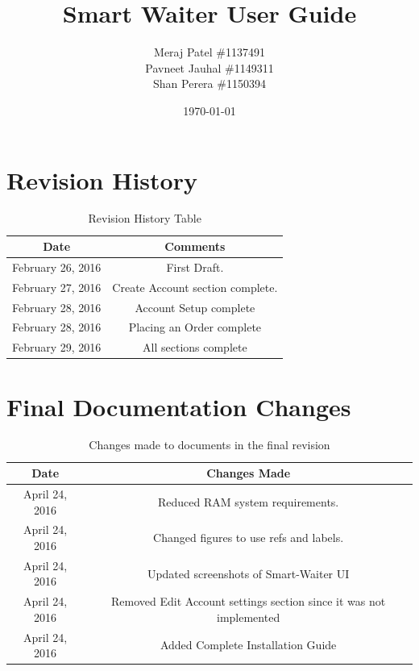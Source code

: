 \documentclass[12pt, titlepage]{article}
\begin{document}
\title{Smart Waiter User Guide} 
\author{Meraj Patel \#1137491 \\ Pavneet Jauhal \#1149311\\ Shan Perera \#1150394}
\date{\today}
\maketitle

\tableofcontents 

\listoftables

\begin{table}[H]
\section*{Revision History}
\begin{tabular}{|c|c|}
\hline
\textbf{Date}  & \textbf{Comments} \\ \hline
February 26, 2016 &  First Draft. \\ 
\hline
February 27, 2016 & Create Account section complete. \\
\hline
February 28, 2016 & Account Setup complete \\
\hline
February 28, 2016 & Placing an Order complete \\
\hline
February 29, 2016 & All sections complete \\
\hline
\end{tabular}
\caption{Revision History Table}
\end{table}

\begin{table}[H]
\section*{Final Documentation Changes}
\begin{tabular}{|c|c|}
\hline
\textbf{Date}  & \textbf{Changes Made} \\ \hline
April 24, 2016 &  Reduced RAM system requirements. \\ 
\hline
April 24, 2016 & Changed figures to use refs and labels. \\
\hline
April 24, 2016 & Updated screenshots of Smart-Waiter UI \\
\hline
April 24, 2016 & Removed Edit Account settings section since it was not implemented \\
\hline
April 24, 2016 & Added Complete Installation Guide \\
\hline
\end{tabular}
\caption{Changes made to documents in the final revision}
\end{table}
\end{document}
